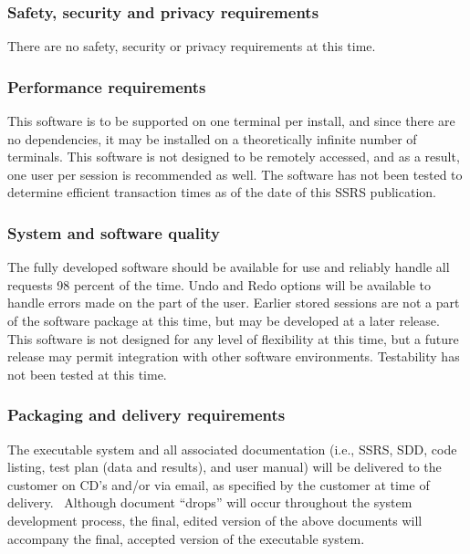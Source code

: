 \documentclass[twoside,letterpaper]{article}
\begin{document}
\subsubsection[Safety, security and privacy requirements]{\rmfamily\bfseries\color{black}
Safety, security and privacy requirements}
{\color{black}
There are no safety, security or privacy requirements at this time.
}

\subsubsection[Performance requirements]{\rmfamily\bfseries\color{black}
Performance requirements}
{\color{black}
This software is to be supported on one terminal per install, and since there are no dependencies,
it may be installed on a theoretically infinite number of terminals. This software is not designed to
be remotely accessed, and as a result, one user per session is recommended as well.
The software has not been tested to determine efficient transaction times as of the date of this SSRS publication.
}

\subsubsection[System and software quality]{\rmfamily\bfseries\color{black} System
and software quality}
{\color{black}
The fully developed software should be available for use and reliably handle all requests 98 percent of the time.  
Undo and Redo options will be available to handle errors made on the part of the user.  
Earlier stored sessions are not a part of the software package at this time, but may be developed at a later release.
This software is not designed for any level of flexibility at this time, but a future release may permit
integration with other software environments. Testability has not been tested at this time.
}

\subsubsection[Packaging and delivery requirements]{\rmfamily\bfseries\color{black}
Packaging and delivery requirements}
{\color{black}
The executable system and all associated documentation (i.e., SSRS, SDD,
code listing, test plan (data and results), and user manual) will be
delivered to the customer on CD{\textquoteright}s and/or via email, as
specified by the customer at time of delivery. \ Although document
{\textquotedblleft}drops{\textquotedblright} will occur throughout the
system development process, the final, edited version of the above
documents will accompany the final, accepted version of the executable
system.}
\end{document}
